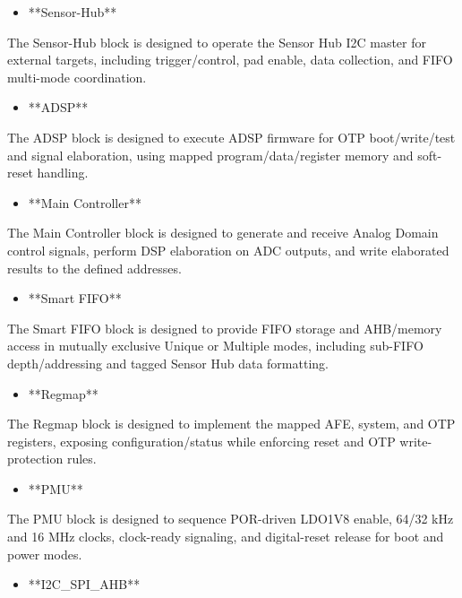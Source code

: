 \documentclass[11pt]{article}
\begin{document}
\begin{itemize}
\item **Sensor-Hub**
\end{itemize}

  The Sensor-Hub block is designed to operate the Sensor Hub I2C master for external targets, including trigger/control, pad enable, data collection, and FIFO multi-mode coordination.

\begin{itemize}
\item **ADSP**
\end{itemize}

  The ADSP block is designed to execute ADSP firmware for OTP boot/write/test and signal elaboration, using mapped program/data/register memory and soft-reset handling.

\begin{itemize}
\item **Main Controller**
\end{itemize}

  The Main Controller block is designed to generate and receive Analog Domain control signals, perform DSP elaboration on ADC outputs, and write elaborated results to the defined addresses.

\begin{itemize}
\item **Smart FIFO**
\end{itemize}

  The Smart FIFO block is designed to provide FIFO storage and AHB/memory access in mutually exclusive Unique or Multiple modes, including sub-FIFO depth/addressing and tagged Sensor Hub data formatting.

\begin{itemize}
\item **Regmap**
\end{itemize}

  The Regmap block is designed to implement the mapped AFE, system, and OTP registers, exposing configuration/status while enforcing reset and OTP write-protection rules.

\begin{itemize}
\item **PMU**
\end{itemize}

  The PMU block is designed to sequence POR-driven LDO1V8 enable, 64/32 kHz and 16 MHz clocks, clock-ready signaling, and digital-reset release for boot and power modes.

\begin{itemize}
\item **I2C\_SPI\_AHB**
\end{itemize}
\end{document}
